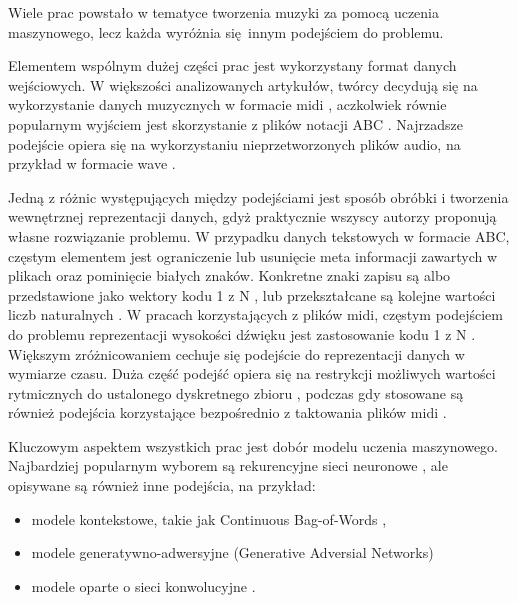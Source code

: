 {{    Wiele prac powstało w tematyce tworzenia muzyki za pomocą uczenia maszynowego, 
    lecz każda wyróżnia się innym podejściem do problemu.

    Elementem wspólnym dużej części prac jest wykorzystany format danych wejściowych.
    W większości analizowanych artykułów, twórcy decydują się na wykorzystanie 
    danych muzycznych w formacie midi \cite{Yang2017MidiNetAC, Hadjeres2016DeepBachAS, Wu2017AHR, Mogren2016CRNNGANCR}, 
    aczkolwiek równie popularnym wyjściem jest skorzystanie z plików notacji ABC \cite{Agarwala2017MusicCU, Sturm2015FolkMS}. 
    Najrzadsze podejście opiera się na wykorzystaniu nieprzetworzonych plików audio, 
    na przykład w formacie wave \cite{Oord2016WaveNetAG}.
    
    Jedną z różnic występujących między podejściami jest sposób obróbki i tworzenia
    wewnętrznej reprezentacji danych, gdyż praktycznie wszyscy autorzy 
    proponują własne rozwiązanie problemu. 
    W przypadku danych tekstowych w formacie ABC, częstym elementem jest ograniczenie
    lub usunięcie meta informacji zawartych w plikach \cite{Agarwala2017MusicCU, Sturm2015FolkMS} oraz pominięcie białych znaków.
    Konkretne znaki zapisu są albo przedstawione jako wektory kodu 1 z N \cite{Sturm2015FolkMS}, 
    lub przekształcane są kolejne wartości liczb naturalnych \cite{Agarwala2017MusicCU}.
    W pracach korzystających z plików midi, częstym podejściem do problemu reprezentacji wysokości
    dźwięku jest zastosowanie kodu 1 z N \cite{Yang2017MidiNetAC}. Większym zróżnicowaniem cechuje się podejście
    do reprezentacji danych w wymiarze czasu. Duża część podejść opiera się na restrykcji możliwych
    wartości rytmicznych do ustalonego dyskretnego zbioru \cite{Hadjeres2016DeepBachAS, Wu2017AHR}, 
    podczas gdy stosowane są również podejścia korzystające bezpośrednio z taktowania 
    plików midi \cite{Mogren2016CRNNGANCR}.

    Kluczowym aspektem wszystkich prac jest dobór modelu uczenia maszynowego.
    Najbardziej popularnym wyborem są rekurencyjne sieci neuronowe \cite{Agarwala2017MusicCU, Sturm2015FolkMS, Souza2018DeepNN, Mogren2016CRNNGANCR},
    ale opisywane są również inne podejścia, na przykład:
    \begin{itemize}
      \item modele kontekstowe, takie jak Continuous Bag-of-Words \cite{Agarwala2017MusicCU},
      \item modele generatywno-adwersyjne (Generative Adversial Networks) \cite{Agarwala2017MusicCU, Mogren2016CRNNGANCR}
      \item modele oparte o sieci konwolucyjne \cite{Yang2017MidiNetAC, Oord2016WaveNetAG}.
    \end{itemize}

}}
